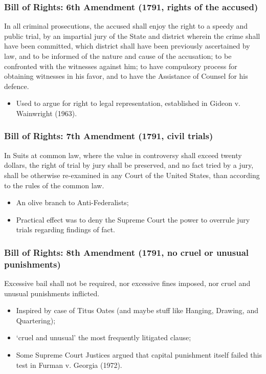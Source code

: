 \documentclass[aspectratio=169]{beamer}
\theoremstyle{principle}
\begin{document}
\begin{frame}
\frametitle{Bill of Rights: 6th Amendment (1791, rights of the accused)}
In all criminal prosecutions, the accused shall enjoy the right to a speedy and public trial, by an impartial jury of the State and district wherein the crime shall have been committed, which district shall have been previously ascertained by law, and to be informed of the nature and cause of the accusation; to be confronted with the witnesses against him; to have compulsory process for obtaining witnesses in his favor, and to have the Assistance of Counsel for his defence.
\bigskip
\begin{itemize}
\item Used to argue for right to legal representation, established in Gideon v. Wainwright (1963).
\end{itemize}

\end{frame}

\begin{frame}
\frametitle{Bill of Rights: 7th Amendment (1791, civil trials)}
In Suits at common law, where the value in controversy shall exceed twenty dollars, the right of trial by jury shall be preserved, and no fact tried by a jury, shall be otherwise re-examined in any Court of the United States, than according to the rules of the common law.
\bigskip
\begin{itemize}
\item An olive branch to Anti-Federalists;
\item Practical effect was to deny the Supreme Court the power to overrule jury trials regarding findings of fact.
\end{itemize}

\end{frame}

\begin{frame}
\frametitle{Bill of Rights: 8th Amendment (1791, no cruel or unusual punishments)}
Excessive bail shall not be required, nor excessive fines imposed, nor cruel and unusual punishments inflicted.
\bigskip
\begin{itemize}
\item Inspired by case of Titus Oates (and maybe stuff like Hanging, Drawing, and Quartering);
\item `cruel and unusual' the most frequently litigated clause;
\item Some Supreme Court Justices argued that capital punishment itself failed this test in Furman v. Georgia (1972).
\end{itemize}

\end{frame}
\end{document}
